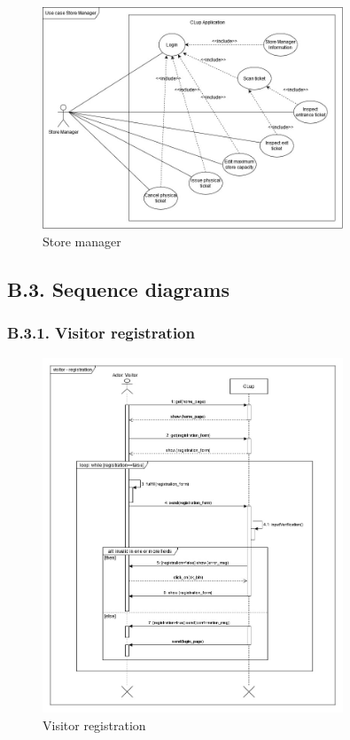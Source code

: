 \begin{figure}[H]
\centering
\includegraphics[width=0.8\textwidth]{use_cases/use_case_store_manager}
\caption{Store manager}
\end{figure}

\subsection{B.3. Sequence diagrams}

\subsubsection{B.3.1. Visitor registration}

\begin{figure}[H]
\centering
\includegraphics[width=0.8\textwidth]{sequence_diagrams/sequence_diagram_visitor_registration}
\caption{Visitor registration}
\end{figure}

